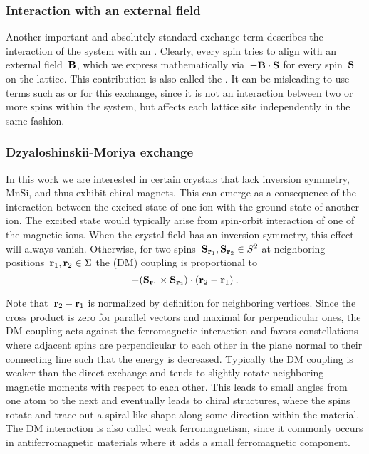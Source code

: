 \subsubsection{Interaction with an external field}

Another important and absolutely standard exchange term describes the
interaction of the system with an . Clearly,
every spin tries to align with an external field~$\B$, which we express
mathematically via~$-\B \cdot \S$ for every spin~$\S$ on the lattice. This
contribution is also called the . It can be misleading to
use terms such as  or  for this
exchange, since it is not an interaction between two or more spins within the
system, but affects each lattice site independently in the same fashion.

\subsubsection{Dzyaloshinskii-Moriya exchange}

In this work we are interested in certain crystals that lack inversion symmetry,
\eg{} MnSi, and thus exhibit chiral magnets. This can emerge as a consequence of
the interaction between the excited state of one ion with the ground state of
another ion. The excited state would typically arise from spin-orbit interaction
of one of the magnetic ions. When the crystal field has an inversion symmetry,
this effect will always vanish. Otherwise, for two spins~$\S_{\r_1}, \S_{\r_2}
\in S^2$ at neighboring positions~$\r_1, \r_2 \in \Sigma$ the
 (DM) coupling is proportional to
%
\begin{equation}
  - (\S_{\r_1} \times \S_{\r_2}) \cdot (\r_2 - \r_1)\:.
\end{equation}
%

Note that~$\r_2 - \r_1$ is normalized by definition for neighboring vertices.
Since the cross product is zero for parallel vectors and maximal for
perpendicular ones, the DM coupling acts against the ferromagnetic interaction
and favors constellations where adjacent spins are perpendicular to each other
in the plane normal to their connecting line such that the energy is decreased.
Typically the DM coupling is weaker than the direct exchange and tends to
slightly rotate neighboring magnetic moments with respect to each other. This
leads to small angles from one atom to the next and eventually leads to chiral
structures, where the spins rotate and trace out a spiral like shape along some
direction within the material. The DM interaction is also called weak
ferromagnetism, since it commonly occurs in antiferromagnetic materials where it
adds a small ferromagnetic component.

